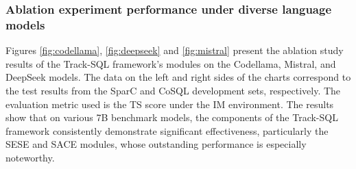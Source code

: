 \documentclass[11pt]{article}
\begin{document}
\begin{table}[]
    \centering
    \renewcommand\arraystretch{1.2}
    \caption{Ablation results of Track-SQL on CoSQL validation set by turn. The numbers in brackets () indicate the number of samples.}
    \label{tab:ablation_by_turn_cosql}
\end{table}

\subsubsection{Ablation experiment performance under diverse language models}
\label{sec:ablation_by_differentLLMs}
Figures \ref{fig:codellama}, \ref{fig:deepseek} and \ref{fig:mistral} present the ablation study results of the Track-SQL framework's modules on the Codellama, Mistral, and DeepSeek models. The data on the left and right sides of the charts correspond to the test results from the SparC and CoSQL development sets, respectively. The evaluation metric used is the TS score under the IM environment. The results show that on various 7B benchmark models, the components of the Track-SQL framework consistently demonstrate significant effectiveness, particularly the SESE and SACE modules, whose outstanding performance is especially noteworthy.
\end{document}
